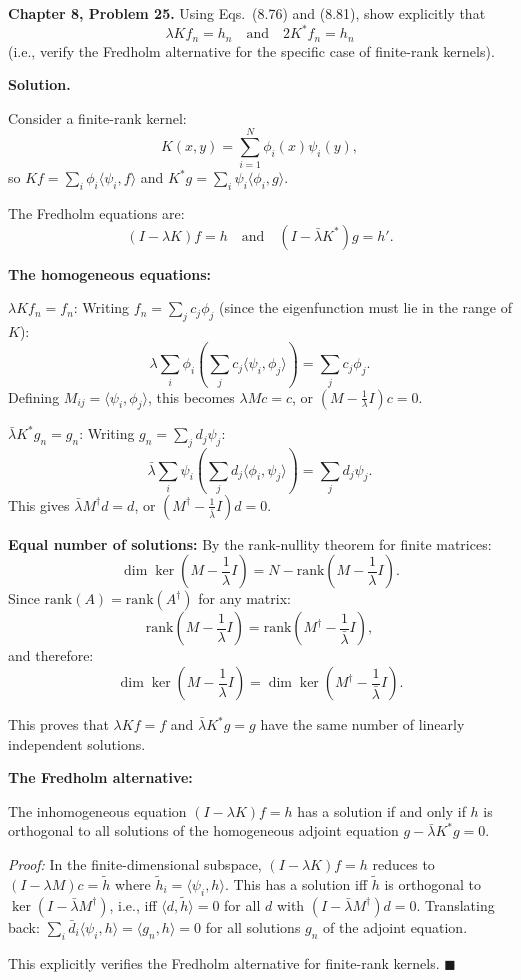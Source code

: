 \documentclass[12pt]{article}
\begin{document}
\textbf{Chapter 8, Problem 25.} Using Eqs.\ (8.76) and (8.81), show explicitly that
\[
\lambda K f_n = h_n \quad\text{and}\quad 2K^*f_n = h_n
\]
(i.e., verify the Fredholm alternative for the specific case of finite-rank kernels).

\bigskip
\textbf{Solution.}

Consider a finite-rank kernel:
\[
K(x,y) = \sum_{i=1}^{N}\phi_i(x)\psi_i(y),
\]
so $Kf = \sum_i \phi_i\langle\psi_i,f\rangle$ and $K^*g = \sum_i\psi_i\langle\phi_i,g\rangle$.

The Fredholm equations are:
\[
(I-\lambda K)f = h \quad\text{and}\quad (I-\bar\lambda K^*)g = h'.
\]

\textbf{The homogeneous equations:}

$\lambda Kf_n = f_n$: Writing $f_n = \sum_j c_j\phi_j$ (since the eigenfunction must lie in the range of $K$):
\[
\lambda\sum_i\phi_i\left(\sum_j c_j\langle\psi_i,\phi_j\rangle\right) = \sum_j c_j\phi_j.
\]
Defining $M_{ij} = \langle\psi_i,\phi_j\rangle$, this becomes $\lambda Mc = c$, or $(M-\frac{1}{\lambda}I)c = 0$.

$\bar\lambda K^*g_n = g_n$: Writing $g_n = \sum_j d_j\psi_j$:
\[
\bar\lambda\sum_i\psi_i\left(\sum_j d_j\langle\phi_i,\psi_j\rangle\right) = \sum_j d_j\psi_j.
\]
This gives $\bar\lambda M^\dagger d = d$, or $(M^\dagger - \frac{1}{\bar\lambda}I)d = 0$.

\textbf{Equal number of solutions:}
By the rank-nullity theorem for finite matrices:
\[
\dim\ker\left(M-\frac{1}{\lambda}I\right) = N - \text{rank}\left(M-\frac{1}{\lambda}I\right).
\]
Since $\text{rank}(A) = \text{rank}(A^\dagger)$ for any matrix:
\[
\text{rank}\left(M-\frac{1}{\lambda}I\right) = \text{rank}\left(M^\dagger - \frac{1}{\bar\lambda}I\right),
\]
and therefore:
\[
\dim\ker\left(M-\frac{1}{\lambda}I\right) = \dim\ker\left(M^\dagger-\frac{1}{\bar\lambda}I\right).
\]

This proves that $\lambda Kf = f$ and $\bar\lambda K^*g = g$ have the same number of linearly independent solutions.

\textbf{The Fredholm alternative:}

The inhomogeneous equation $(I-\lambda K)f = h$ has a solution if and only if $h$ is orthogonal to all solutions of the homogeneous adjoint equation $g - \bar\lambda K^*g = 0$.

\textit{Proof:} In the finite-dimensional subspace, $(I-\lambda K)f = h$ reduces to $(I-\lambda M)c = \tilde{h}$ where $\tilde{h}_i = \langle\psi_i,h\rangle$. This has a solution iff $\tilde{h}$ is orthogonal to $\ker(I-\bar\lambda M^\dagger)$, i.e., iff $\langle d,\tilde{h}\rangle = 0$ for all $d$ with $(I-\bar\lambda M^\dagger)d = 0$. Translating back: $\sum_i \bar{d}_i\langle\psi_i,h\rangle = \langle g_n,h\rangle = 0$ for all solutions $g_n$ of the adjoint equation.

This explicitly verifies the Fredholm alternative for finite-rank kernels. $\blacksquare$
\end{document}
